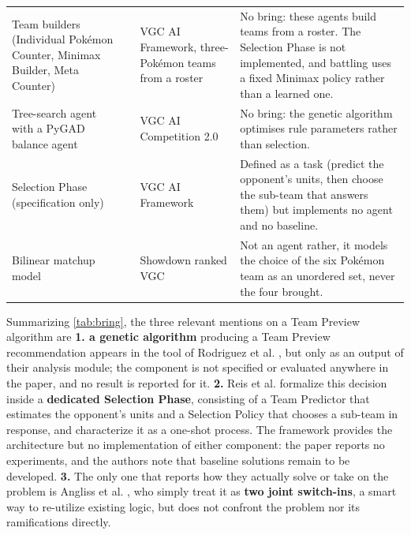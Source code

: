 \documentclass[conference]{IEEEtran}
\begin{document}
\begin{table}[!t]
\begin{tabular}{@{}p{3.3cm}p{1.6cm}p{3.4cm}p{8.2cm}@{}}
\addlinespace
Team builders (Individual Pok\'emon Counter, Minimax Builder, Meta Counter) & \cite{reis2024} & VGC AI Framework, three-Pok\'emon teams from a roster & No bring: these agents build teams from a roster. The Selection Phase is not implemented, and battling uses a fixed Minimax policy rather than a learned one.\\
\addlinespace
Tree-search agent with a PyGAD balance agent & \cite{reis2025} & VGC AI Competition 2.0 & No bring: the genetic algorithm optimises rule parameters rather than selection. \\
\addlinespace
Selection Phase (specification only) & \cite{reis2021} & VGC AI Framework & Defined as a task (predict the opponent's units, then choose the sub-team that answers them) but implements no agent and no baseline.\\
\addlinespace
Bilinear matchup model & \cite{oblander2025} & Showdown ranked VGC & Not an agent rather, it models the choice of the six Pok\'emon team as an unordered set, never the four brought.\\
\bottomrule
\end{tabular}
\end{table}

Summarizing \ref{tab:bring}, the three relevant mentions on a Team Preview algorithm are \textbf{1. a genetic algorithm} producing a Team Preview recommendation appears in the tool of Rodriguez et al. \cite{rodriguez2024}, but only as an output of their analysis module; the component is not specified or evaluated anywhere in the paper, and no result is reported for it.\textbf{ 2.} Reis et al. \cite{reis2021} formalize this decision inside a \textbf{dedicated Selection Phase}, consisting of a Team Predictor that estimates the opponent's units and a Selection Policy that chooses a sub-team in response, and characterize it as a one-shot process. The framework provides the architecture but no implementation of either component: the paper reports no experiments, and the authors note that baseline solutions remain to be developed. \textbf{3.} The only one that reports how they actually solve or take on the problem is Angliss et al. \cite{angliss2026}, who simply treat it as \textbf{two joint switch-ins}, a smart way to re-utilize existing logic, but does not confront the problem nor its ramifications directly. 
\end{document}
